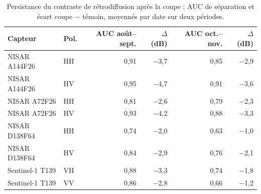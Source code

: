 \begin{table}[htbp]
\centering
\small
\caption{Persistance du contraste de rétrodiffusion après la coupe : AUC de séparation et écart coupe $-$ témoin, moyennés par date sur deux périodes.}
\label{tab:persistence}
\begin{tabular}{llrrrr}
\toprule
Capteur & Pol. & AUC août--sept. & $\Delta$ (dB) & AUC oct.--nov. & $\Delta$ (dB) \\
\midrule
NISAR A144F26 & HH & 0{,}91 & $-$3{,}7 & 0{,}85 & $-$2{,}9 \\
NISAR A144F26 & HV & 0{,}95 & $-$4{,}7 & 0{,}91 & $-$3{,}6 \\
NISAR A72F26 & HH & 0{,}81 & $-$2{,}6 & 0{,}79 & $-$2{,}3 \\
NISAR A72F26 & HV & 0{,}93 & $-$4{,}2 & 0{,}88 & $-$3{,}3 \\
NISAR D138F64 & HH & 0{,}74 & $-$2{,}0 & 0{,}63 & $-$1{,}0 \\
NISAR D138F64 & HV & 0{,}84 & $-$2{,}9 & 0{,}76 & $-$2{,}1 \\
Sentinel-1 T139 & VH & 0{,}88 & $-$3{,}3 & 0{,}74 & $-$1{,}8 \\
Sentinel-1 T139 & VV & 0{,}86 & $-$2{,}8 & 0{,}66 & $-$1{,}2 \\
\bottomrule
\end{tabular}
\end{table}
